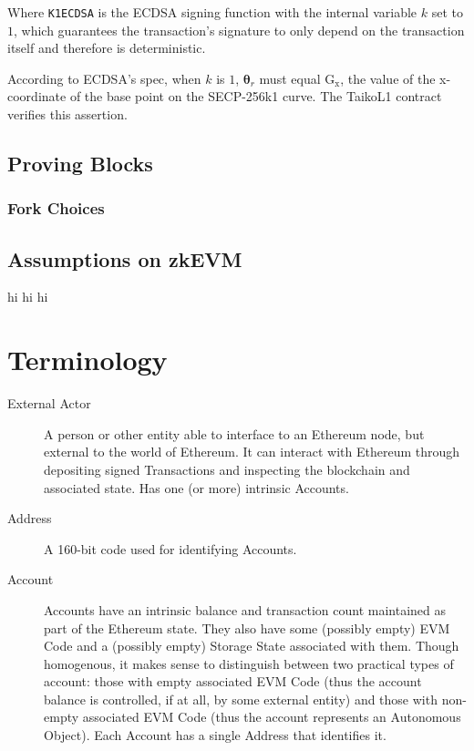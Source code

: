 \documentclass[9pt,oneside]{amsart}
\begin{document}
\begin{multicols}{2}
Where \texttt{K1ECDSA} is the ECDSA signing function with the internal variable $k$ set to $1$, which guarantees the transaction's signature to only depend on the transaction itself and therefore is deterministic.

According to ECDSA's spec, when $k$ is $1$, $\boldsymbol{\theta}_r$ must equal $\mathrm{G_x}$, the value of the x-coordinate of the base point on the SECP-256k1 curve. The TaikoL1 contract verifies this assertion.





\subsection{Proving Blocks} \label{sec:proving}





\subsubsection{Fork Choices} \label{sec:forkchoices}






\subsection{Assumptions on zkEVM}
hi hi hi






\end{multicols}


\appendix

\section{Terminology} \label{ch:Terminology}

\begin{description}
\item[External Actor] A person or other entity able to interface to an Ethereum node, but external to the world of Ethereum. It can interact with Ethereum through depositing signed Transactions and inspecting the blockchain and associated state. Has one (or more) intrinsic Accounts.

\item[Address] A 160-bit code used for identifying Accounts.

\item[Account] Accounts have an intrinsic balance and transaction count maintained as part of the Ethereum state. They also have some (possibly empty) EVM Code and a (possibly empty) Storage State associated with them. Though homogenous, it makes sense to distinguish between two practical types of account: those with empty associated EVM Code (thus the account balance is controlled, if at all, by some external entity) and those with non-empty associated EVM Code (thus the account represents an Autonomous Object). Each Account has a single Address that identifies it.

\end{description}
\end{document}
